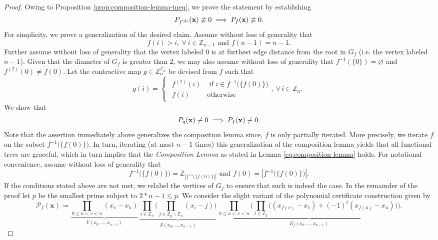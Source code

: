 \begin{proof}
Owing to Proposition \ref{prop:composition-lemma-ineq}, we prove the statement by establishing 
\[
    P_{f^{(2)}} ({\bf x}) \not\equiv 0  \implies  P_{f} ({\bf x}) \not\equiv 0.
\]
For simplicity, we prove a generalization of the desired claim. Assume without loss of generality that
\[
f(i)>i,\ \forall\:i\in\mathbb{Z}_{n-1}\text{  and  }f(n-1)=n-1.
\]
Further assume without loss of generality that the vertex labeled $0$ is at furthest edge distance from the root in $G_f$ (i.e. the vertex labeled $n-1$). Given that the diameter of $G_{f}$ is greater than $2$, we may also assume without loss of generality that  $f^{-1}\left(\{0\}\right)=\varnothing$
and $f^{(2)}(0)\ne f(0)$. Let the contractive
map $g\in\mathbb{Z}_{n}^{\mathbb{Z}_{n}}$ be devised from $f$ such that 
\begin{equation}
g(i)=\begin{cases}
\begin{array}{cc}
f^{(2)}(i) & \text{ if }i\in f^{-1}\big(\{f(0)\}\big)\\
f(i) & \text{otherwise}
\end{array},\ \forall\,i\in\mathbb{Z}_{n}.\end{cases}
\end{equation}
We show that
\begin{equation} \label{eq:composition-lemma-generalized}
P_{g} ({\bf x}) \not\equiv 0  \implies  P_{f} ({\bf x}) \not\equiv 0.
\end{equation}
Note that the assertion immediately above generalizes the composition
lemma since, $f$ is only partially
iterated. More precisely, we iterate $f$ on the subset $f^{-1}\big(\{f(0)\}\big)$.
In turn, iterating (at most $n-1$ times) this generalization  of the composition lemma yields
that all functional trees are graceful, which in turn implies that the \textit{Composition Lemma} as stated in Lemma \ref{eq:composition-lemma}  holds. For notational convenience, assume without loss of generality that 
\begin{equation}
f^{-1}\big(\{f(0)\}\big)=\mathbb{Z}_{\left|f^{-1}\big(\{f(0)\}\big)\right|}\text{  and  }f(0)=\left|f^{-1}\big(\{f(0)\}\big)\right|.
\end{equation}
If the conditions stated above are not met, we relabel the vertices of $G_f$ to ensure that such is indeed the case. In the remainder of the proof let $p$ be the smallest prime subject to $2*n-1\le p$. We consider the slight variant of the polynomial certificate construction given by
\[
\mathcal{P}_{f}(\mathbf{x})\coloneq\underbrace{\prod_{0\le u<v<n}(x_{v}-x_{u})}_{V(x_{0},\ldots,x_{n-1})}\,\underbrace{\prod_{i\in\mathbb{Z}_{n}}\big(\prod_{j\in\mathbb{Z}_{p}\backslash\mathbb{Z}_{n}}(x_{i}-j)\big)}_{\mathcal{S}(x_{0},\ldots,x_{n-1})}\,\underbrace{\prod_{0\le u<v<n}\bigg(\prod_{t\in\mathbb{Z}_{2}}\big((x_{f(v)}-x_{v})+(-1)^{t}(x_{f(u)}-x_{u})\big)\bigg)}_{E_{f}(x_{0},\ldots,x_{n-1})}.
\]
\end{proof}
